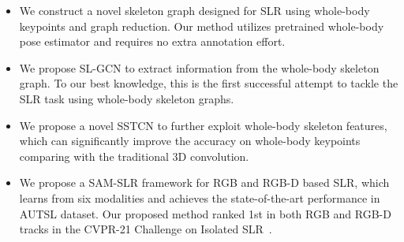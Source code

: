\documentclass[final]{cvpr}
\begin{document}
\begin{itemize}
\item We construct a novel skeleton graph designed for SLR using whole-body keypoints and graph reduction. Our method utilizes pretrained whole-body pose estimator and requires no extra annotation effort. 

\item We propose SL-GCN to extract information from the whole-body skeleton graph. To our best knowledge, this is the first successful attempt to tackle the SLR task using whole-body skeleton graphs.  

\item We propose a novel SSTCN to further exploit whole-body skeleton features, which can significantly improve the accuracy on whole-body keypoints comparing with the traditional 3D convolution.


\item We propose a SAM-SLR framework for RGB and RGB-D based SLR, which learns from six modalities and achieves the state-of-the-art performance in AUTSL dataset. 
Our proposed method ranked 1st in both RGB and RGB-D tracks in the CVPR-21 Challenge on Isolated SLR~\cite{Sincan:CVPRW:2021}.
\end{itemize}
\end{document}
